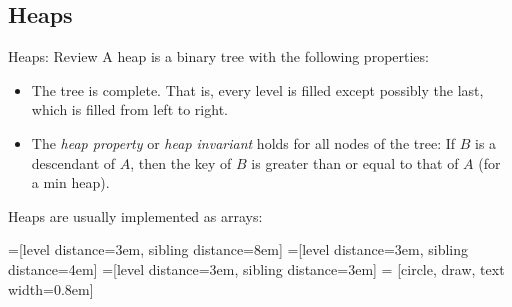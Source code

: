 \documentclass[9pt]{beamer}
\begin{document}
\subsection{Heaps}
\begin{frame}[fragile]{Heaps: Review}
  A heap is a binary tree with the following properties:
  \begin{itemize}
    \item
      The tree is complete. That is, every level is filled except possibly
      the last, which is filled from left to right.
    \item
      The {\em heap property} or {\em heap invariant} holds for all nodes of
      the tree: If $B$ is a descendant of $A$, then the key of $B$ is
      greater than or equal to that of $A$ (for a min heap).
  \end{itemize}

  \pause
  Heaps are usually implemented as arrays:

  =[level distance=3em, sibling distance=8em]
  =[level distance=3em, sibling distance=4em]
  =[level distance=3em, sibling distance=3em]
   = [circle, draw, text width=0.8em]

\end{frame}
\end{document}
